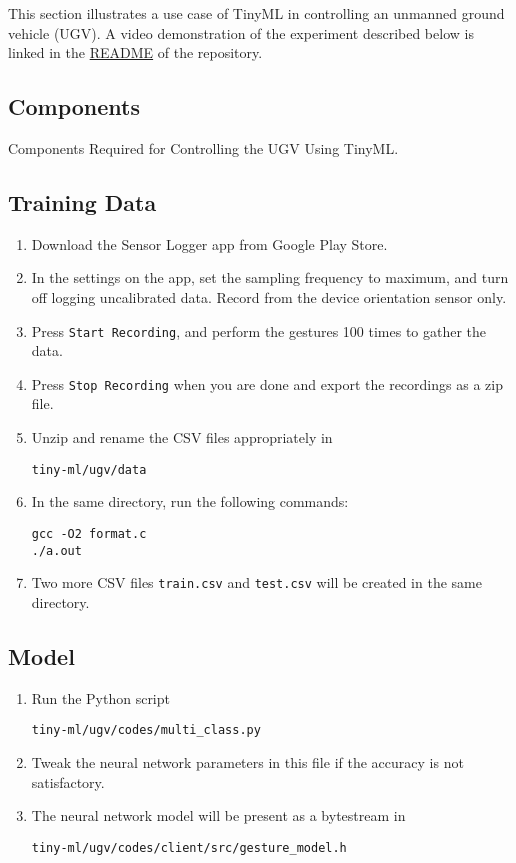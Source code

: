 This section illustrates a use case of TinyML in controlling an unmanned ground 
vehicle (UGV). A video demonstration of the experiment described below is 
linked in the \href{https://github.com/gadepall/aiml#TinyML}{README} of the 
repository.

\subsection{Components}
\begin{table}[!ht]
    \centering
    
    \caption{Components Required for Controlling the UGV Using TinyML.}
    \label{tab:ugv-components}
\end{table}

\subsection{Training Data}
\begin{enumerate}
    \item Download the Sensor Logger app from Google Play Store.
    \item In the settings on the app, set the sampling frequency to maximum, 
    and turn off logging uncalibrated data. Record from the device orientation 
    sensor only.
    \item Press \texttt{Start Recording}, and perform the gestures 100 times
    to gather the data.
    \item Press \texttt{Stop Recording} when you are done and export the 
    recordings as a zip file.
    \item Unzip and rename the CSV files appropriately in
    \begin{lstlisting}
tiny-ml/ugv/data
    \end{lstlisting}
    \item In the same directory, run the following commands:
    \begin{lstlisting}
gcc -O2 format.c
./a.out
    \end{lstlisting}
    \item Two more CSV files \texttt{train.csv} and \texttt{test.csv} will be 
    created in the same directory.
\end{enumerate}

\subsection{Model}
\begin{enumerate}
    \item Run the Python script
    \begin{lstlisting}
tiny-ml/ugv/codes/multi_class.py
    \end{lstlisting}
    \item Tweak the neural network parameters in this file if the accuracy is
    not satisfactory.
    \item The neural network model will be present as a bytestream in
    \begin{lstlisting}
tiny-ml/ugv/codes/client/src/gesture_model.h  
    \end{lstlisting}
\end{enumerate}

